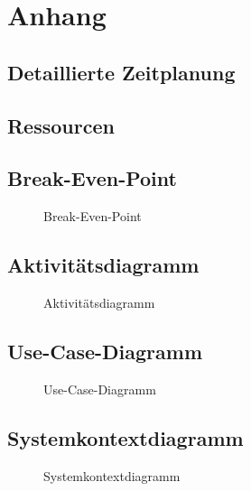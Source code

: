 \section{Anhang}
\subsection{Detaillierte Zeitplanung}
\label{app:Zeitplanung}
\clearpage

\subsection{Ressourcen}
\label{app:Ressourcen}

\clearpage

\subsection{Break-Even-Point}
\label{app:BreakEvenPoint}
\begin{figure}[!htb]
    \centering
    \caption{Break-Even-Point}
\end{figure}


\clearpage

\subsection{Aktivitätsdiagramm}
\label{app:Aktivitaet}
\begin{figure}[!htb]
    \centering
    \caption{Aktivitätsdiagramm}
\end{figure}
\clearpage

\subsection{Use-Case-Diagramm}
\label{app:UseCase}
\begin{figure}[!htb]
    \centering
    \caption{Use-Case-Diagramm}
\end{figure}
\clearpage

\subsection{Systemkontextdiagramm}
\label{app:Systemkontext}
\begin{figure}[!h]
    \centering
    \caption{Systemkontextdiagramm}
\end{figure}

